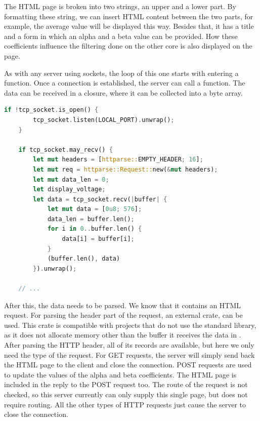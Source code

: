 The HTML page is broken into two strings, an upper and a lower part. By formatting these string, we can insert HTML content between the two parts, for example, the average value will be displayed this way. Besides that, it has a title and a form in which an alpha and a beta value can be provided. How these coefficients influence the filtering done on the other core is also displayed on the page.

As with any server using sockets, the loop of this one starts with entering a  function. Once a connection is established, the server can call a  function. The data can be received in a closure, where it can be collected into a byte array.

\begin{lstlisting}[language=Rust,frame=single,float=!ht,style=customrust,label={lst:server-recv},caption={Receiving the Contents of the TCP Buffer}]
    if !tcp_socket.is_open() {
        tcp_socket.listen(LOCAL_PORT).unwrap();
    }

    if tcp_socket.may_recv() {
        let mut headers = [httparse::EMPTY_HEADER; 16];
        let mut req = httparse::Request::new(&mut headers);
        let mut data_len = 0;
        let display_voltage;
        let data = tcp_socket.recv(|buffer| {
            let mut data = [0u8; 576];
            data_len = buffer.len();
            for i in 0..buffer.len() {
                data[i] = buffer[i];
            }
            (buffer.len(), data)
        }).unwrap();

    // ...
\end{lstlisting}

After this, the data needs to be parsed. We know that it contains an HTML request. For parsing the header part of the request, an external crate,  can be used. This crate is compatible with projects that do not use the standard library, as it does not allocate memory other than the buffer it receives the data in \cite{Httparse}. After parsing the HTTP header, all of its records are available, but here we only need the type of the request. For GET requests, the server will simply send back the HTML page to the client and close the connection. POST requests are used to update the values of the alpha and beta coefficients. The HTML page is included in the reply to the POST request too. The route of the request is not checked, so this server currently can only supply this single page, but does not require routing. All the other types of HTTP requests just cause the server to close the connection.

